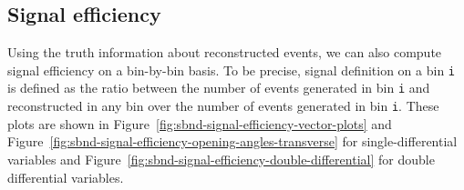 \documentclass{article}
\begin{document}
\subsection{Signal efficiency}

Using the truth information about reconstructed events, we can also compute signal efficiency on a bin-by-bin basis. To be precise, signal definition on a bin \verb|i| is defined as the ratio between the number of events generated in bin \verb|i| and reconstructed in any bin over the number of events generated in bin \verb|i|. These plots are shown in Figure~\ref{fig:sbnd-signal-efficiency-vector-plots} and Figure~\ref{fig:sbnd-signal-efficiency-opening-angles-transverse} for single-differential variables and Figure~\ref{fig:sbnd-signal-efficiency-double-differential} for double differential variables.
\end{document}
